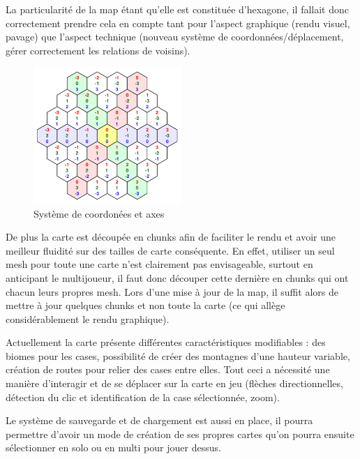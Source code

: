 \documentclass[12pt]{report}
\begin{document}
La particularité de la map étant qu’elle est constituée d’hexagone, il fallait donc correctement prendre cela en compte tant pour l’aspect graphique (rendu visuel, pavage) que l’aspect technique (nouveau système de coordonnées/déplacement, gérer correctement les relations de voisins).

\begin{figure}[H]
    \centering
    \includegraphics[width=0.5\textwidth]{cubic_coordinates}
    \caption{Système de coordonées et axes}
\end{figure}

De plus la carte est découpée en chunks afin de faciliter le rendu et avoir une meilleur fluidité sur des tailles de carte conséquente. En effet, utiliser un seul mesh pour toute une carte n’est clairement pas envisageable, surtout en anticipant le multijoueur, il faut donc découper cette dernière en chunks qui ont chacun leurs propres mesh. Lors d’une mise à jour de la map, il suffit alors de mettre à jour quelques chunks et non toute la carte (ce qui allège considérablement le rendu graphique).

Actuellement la carte présente différentes caractéristiques modifiables : des biomes pour les cases, possibilité de créer des montagnes d’une hauteur variable, création de routes pour relier des cases entre elles. Tout ceci a nécessité une manière d’interagir et de se déplacer sur la carte en jeu (flèches directionnelles, détection du clic et identification de la case sélectionnée, zoom).

\begin{figure}[H]
    \centering
\end{figure}

Le système de sauvegarde et de chargement est aussi en place, il pourra permettre d’avoir un mode de création de ses propres cartes qu’on pourra ensuite sélectionner en solo ou en multi pour jouer dessus.
\end{document}
